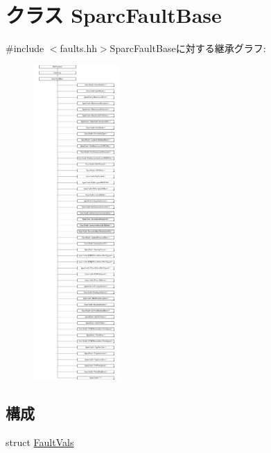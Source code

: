 \hypertarget{classSparcISA_1_1SparcFaultBase}{
\section{クラス SparcFaultBase}
\label{classSparcISA_1_1SparcFaultBase}
}


{\ttfamily \#include $<$faults.hh$>$}SparcFaultBaseに対する継承グラフ:\begin{figure}[H]
\begin{center}
\leavevmode
\includegraphics[height=12cm]{classSparcISA_1_1SparcFaultBase}
\end{center}
\end{figure}
\subsection*{構成}
\begin{DoxyCompactItemize}
\item 
struct \hyperlink{structSparcISA_1_1SparcFaultBase_1_1FaultVals}{FaultVals}
\end{DoxyCompactItemize}
